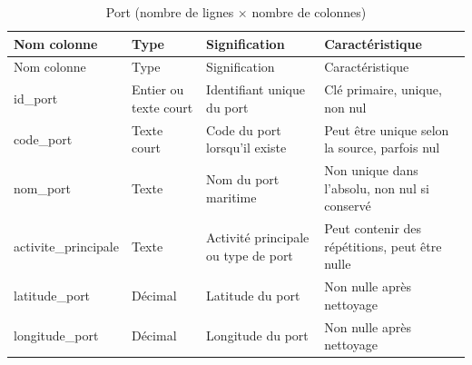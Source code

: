 \documentclass[mstat,12pt]{unswthesis}
\begin{document}
\begin{longtable}[]{@{}
  >{\centering\arraybackslash}p{}
  >{\centering\arraybackslash}p{}
  >{\centering\arraybackslash}p{}
  >{\centering\arraybackslash}p{}@{}}
\caption{Port (nombre de lignes \(\times\) nombre de
colonnes)}\tabularnewline
\toprule\noalign{}
\begin{minipage}[b]{\linewidth}\centering
Nom colonne
\end{minipage} & \begin{minipage}[b]{\linewidth}\centering
Type
\end{minipage} & \begin{minipage}[b]{\linewidth}\centering
Signification
\end{minipage} & \begin{minipage}[b]{\linewidth}\centering
Caractéristique
\end{minipage} \\
\midrule\noalign{}
\endfirsthead
\toprule\noalign{}
\begin{minipage}[b]{\linewidth}\centering
Nom colonne
\end{minipage} & \begin{minipage}[b]{\linewidth}\centering
Type
\end{minipage} & \begin{minipage}[b]{\linewidth}\centering
Signification
\end{minipage} & \begin{minipage}[b]{\linewidth}\centering
Caractéristique
\end{minipage} \\
\midrule\noalign{}
\endhead
\bottomrule\noalign{}
\endlastfoot
id\_port & Entier ou texte court & Identifiant unique du port & Clé
primaire, unique, non nul \\
code\_port & Texte court & Code du port lorsqu'il existe & Peut être
unique selon la source, parfois nul \\
nom\_port & Texte & Nom du port maritime & Non unique dans l'absolu, non
nul si conservé \\
activite\_principale & Texte & Activité principale ou type de port &
Peut contenir des répétitions, peut être nulle \\
latitude\_port & Décimal & Latitude du port & Non nulle après
nettoyage \\
longitude\_port & Décimal & Longitude du port & Non nulle après
nettoyage \\
\end{longtable}
\end{document}
